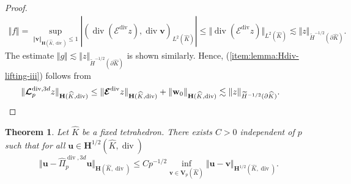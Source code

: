 \documentclass{article}
\newtheorem{theorem}{Theorem}[section]
\newcommand{\hatPidivcom}{\widehat\Pi^{\operatorname*{div},3d}_{p}}
\begin{document}
\begin{proof}
\begin{align*}
\Vert f\Vert = \operatorname*{sup}_{\Vert\mathbf{v}\Vert_{\mathbf{H}(\widehat{K},\operatorname*{div})} \leq 1} |(\operatorname*{div}(\boldsymbol{\mathcal{E}}^{\operatorname*{div}}z),\operatorname*{div}\mathbf{v})_{L^2(\widehat{K})}| \leq \Vert\operatorname*{div}(\boldsymbol{\mathcal{E}}^{\operatorname*{div}}z)\Vert_{L^2(\widehat{K})} \lesssim \Vert z\Vert_{\widetilde{H}^{-1/2}(\partial\widehat{K})}.
\end{align*}
The estimate
$\displaystyle 
\Vert g\Vert \lesssim \Vert z\Vert_{\widetilde{H}^{-1/2}(\partial\widehat{K})}
$
is shown similarly. Hence, (\ref{item:lemma:Hdiv-lifting-iii}) follows from
\begin{align*}
\Vert\boldsymbol{\mathcal{L}}^{\operatorname*{div},3d}_p z\Vert_{\mathbf{H}(\widehat{K},\operatorname*{div})} \leq \Vert\boldsymbol{\mathcal{E}}^{\operatorname*{div}}z\Vert_{\mathbf{H}(\widehat{K},\operatorname*{div})} + \Vert\mathbf{w}_0\Vert_{\mathbf{H}(\widehat{K},\operatorname*{div})} \lesssim \Vert z\Vert_{\widetilde{H}^{-1/2}(\partial\widehat{K})}.
\qquad 
\qedhere
\end{align*}
\end{proof}

\begin{theorem}
\label{thm:H1div-approximation} 
Let $\widehat K$ be a fixed tetrahedron.
There exists $C>0$ independent of $p$ such
that for all ${\mathbf{u}}\in{\mathbf{H}}^{1/2}(\widehat{K},\operatorname{div}%
)$
\begin{equation}
\Vert{\mathbf{u}}-\hatPidivcom{\mathbf{u}}%
\Vert_{{\mathbf{H}}(\widehat{K},\operatorname{div})}\leq Cp^{-1/2}%
\inf_{{\mathbf v} \in {\mathbf V}_p(\widehat K)} 
\Vert{\mathbf{u} - \mathbf{v}}\Vert_{{\mathbf{H}}^{1/2}(\widehat{K},\operatorname{div})}.
\label{eq:thmH1div-approximation-10}%
\end{equation}
\end{theorem}
\end{document}
